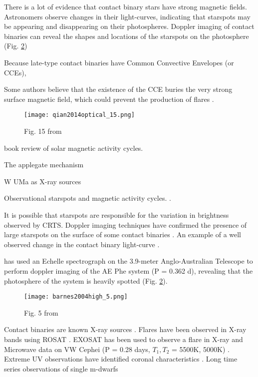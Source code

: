 \documentclass[12pt]{article} %
\numberwithin{equation}{section} %
\begin{document}
There is a lot of evidence that contact binary stars have strong magnetic fields. Astronomers observe changes in their light-curves, indicating that starspots may be appearing and disappearing on their photospheres. Doppler imaging of contact binaries can reveal the shapes and locations of the starspots on the photosphere (Fig. \ref{fig: barnes2004high_5})

 Because late-type contact binaries have Common Convective Envelopes (or CCEs), 

Some authors believe that the existence of the CCE buries the very strong surface magnetic field, which could prevent the production of flares \citep{qian2014optical}. 

\begin{figure}[H]
\centering
\texttt{[image: qian2014optical\_15.png]}
\caption{Fig. 15 from \citet{qian2014optical}}
\label{fig: qian2014optical_15}
\end{figure}

\citep{balogh2015solar} book review of solar magnetic activity cycles.

The applegate mechanism \citep{applegate1992mechanism} \citep{lanza2006internal}

W UMa as X-ray sources \citep{stepien2001rosat}

Observational starspots and magnetic activity cycles.  \citep{borkovits2005indirect,qian2000possible,kaszas1998period,qian2007ad,lee2004period,yang2012deep,zhang2004long}.

It is possible that starspots are responsible for the variation in brightness observed by CRTS. Doppler imaging techniques have confirmed the presence of large starspots on the surface of some contact binaries \citep{barnes2004high}.  An example of a well observed change in the contact binary light-curve \citep{gazeas2006modeling}.

\citet{barnes2004high} has used an Echelle spectrograph on the 3.9-meter Anglo-Australian Telescope to perform doppler imaging of the AE Phe system (P = 0.362 d), revealing that the photosphere of the system is heavily spotted (Fig. \ref{fig: barnes2004high_5}).

\begin{figure}[H]
\centering
\texttt{[image: barnes2004high\_5.png]}
\caption{Fig. 5 from \citet{barnes2004high}}
\label{fig: barnes2004high_5}
\end{figure}

Contact binaries are known X-ray sources \citep{chen2006w}. Flares have been observed in X-ray bands using ROSAT \citep{mcgale1996rosat}.
EXOSAT has been used to observe a flare in X-ray and Microwave data on VW Cephei (P =  0.28 days, $T_{1}, T_{2}$ = 5500K, 5000K) \citep{vilhu1988simultaneous}. Extreme UV observations have identified coronal characteristics \citep{brickhouse1998extreme}. Long time series observations of single m-dwarfs  \citep{lacy1976uv}
\end{document}
